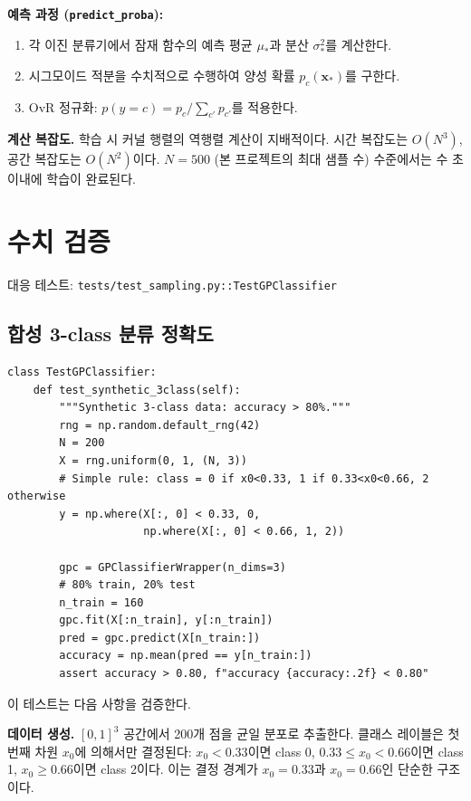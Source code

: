 \documentclass[11pt]{article}
\begin{document}
\textbf{예측 과정 (\texttt{predict\_proba}):}
\begin{enumerate}[nosep]
  \item 각 이진 분류기에서 잠재 함수의 예측 평균 $\mu_*$과 분산 $\sigma_*^2$를 계산한다.
  \item 시그모이드 적분을 수치적으로 수행하여 양성 확률 $p_c(\mathbf{x}_*)$를 구한다.
  \item OvR 정규화: $p(y = c) = p_c / \sum_{c'} p_{c'}$를 적용한다.
\end{enumerate}

\textbf{계산 복잡도.}
학습 시 커널 행렬의 역행렬 계산이 지배적이다.
시간 복잡도는 $O(N^3)$, 공간 복잡도는 $O(N^2)$이다.
$N = 500$ (본 프로젝트의 최대 샘플 수) 수준에서는 수 초 이내에 학습이 완료된다.


\section{수치 검증}

\noindent 대응 테스트: \texttt{tests/test\_sampling.py::TestGPClassifier}

\subsection{합성 3-class 분류 정확도}

\begin{lstlisting}
class TestGPClassifier:
    def test_synthetic_3class(self):
        """Synthetic 3-class data: accuracy > 80%."""
        rng = np.random.default_rng(42)
        N = 200
        X = rng.uniform(0, 1, (N, 3))
        # Simple rule: class = 0 if x0<0.33, 1 if 0.33<x0<0.66, 2 otherwise
        y = np.where(X[:, 0] < 0.33, 0,
                     np.where(X[:, 0] < 0.66, 1, 2))

        gpc = GPClassifierWrapper(n_dims=3)
        # 80% train, 20% test
        n_train = 160
        gpc.fit(X[:n_train], y[:n_train])
        pred = gpc.predict(X[n_train:])
        accuracy = np.mean(pred == y[n_train:])
        assert accuracy > 0.80, f"accuracy {accuracy:.2f} < 0.80"
\end{lstlisting}

이 테스트는 다음 사항을 검증한다.

\textbf{데이터 생성.}
$[0,1]^3$ 공간에서 200개 점을 균일 분포로 추출한다.
클래스 레이블은 첫 번째 차원 $x_0$에 의해서만 결정된다:
$x_0 < 0.33$이면 class 0, $0.33 \leq x_0 < 0.66$이면 class 1, $x_0 \geq 0.66$이면 class 2이다.
이는 결정 경계가 $x_0 = 0.33$과 $x_0 = 0.66$인 단순한 구조이다.
\end{document}
